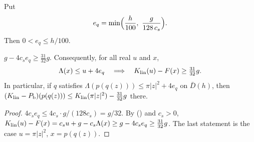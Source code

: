 \begin{definition}\label{def:fcp-eq}
Put
\[
 e_q=\min\Bigl(\frac h{100},\ \frac g{128\,c_s}\Bigr).
\]
Then $0<e_q\le h/100$.
\end{definition}

\begin{lemma}[Margin]\label{lem:fcp-margin}
$g-4c_se_q\ge\frac{31}{32}g$. Consequently, for all real $u$ and $x$,
\[
 \Lambda(x)\le u+4e_q\quad\Longrightarrow\quad K_{\rm lin}(u)-F(x)\ge\tfrac{31}{32}g .
\]
In particular, if $q$ satisfies $\Lambda(p(q(z)))\le\pi|z|^2+4e_q$ on $\bar D(h)$, then
$(K_{\rm lin}-P_{\mathrm b})(p(q(z)))\le K_{\rm lin}(\pi|z|^2)-\frac{31}{32}g$ there.
\end{lemma}

\begin{proof}
$4c_se_q\le4c_s\cdot g/(128c_s)=g/32$. By () and $c_s>0$,
$K_{\rm lin}(u)-F(x)=c_su+g-c_s\Lambda(x)\ge g-4c_se_q\ge\frac{31}{32}g$. The last statement is the case $u=\pi|z|^2$,
$x=p(q(z))$.
\end{proof}
